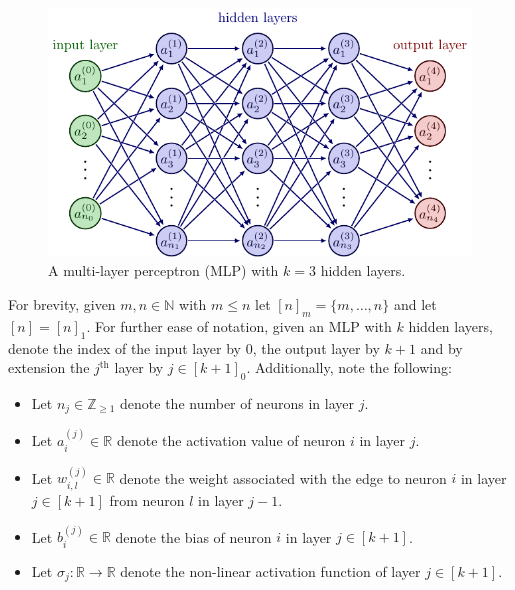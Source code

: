 \documentclass[11pt]{article}
\begin{document}
\begin{figure}[t]
    \centering
    \includegraphics[width=1\linewidth]{./figures/neural_nets/MLP_1.pdf}
    \caption{A multi-layer perceptron (MLP) with $k=3$ hidden layers.}
    \label{fig:MLP}
\end{figure}

For brevity, given $m,n\in\mathbb{N}$ with $m\leq n$ let $[n]_m=\{m,\dots,n\}$ and let $[n]=[n]_1$. For further ease of notation, given an MLP with $k$ hidden layers, denote the index of the input layer by $0$, the output layer by $k+1$ and by extension the $j^{\text{th}}$ layer by $j\in[k+1]_0$. Additionally, note the following:
\begin{itemize}
    \item Let $n_j\in\mathbb{Z}_{\geq1}$ denote the number of neurons in layer $j$.
    \item Let $a_i^{(j)}\in\mathbb{R}$ denote the activation value of neuron $i$ in layer $j$.
    \item Let $w_{i,l}^{(j)}\in\mathbb{R}$ denote the weight associated with the edge to neuron $i$ in layer $j\in[k+1]$ from neuron $l$ in layer $j-1$.
    \item Let $b_i^{(j)}\in\mathbb{R}$ denote the bias of neuron $i$ in layer $j\in[k+1]$.
    \item Let $\sigma_j:\mathbb{R}\rightarrow\mathbb{R}$ denote the non-linear activation function of layer $j\in[k+1]$.
\end{itemize}
\end{document}
